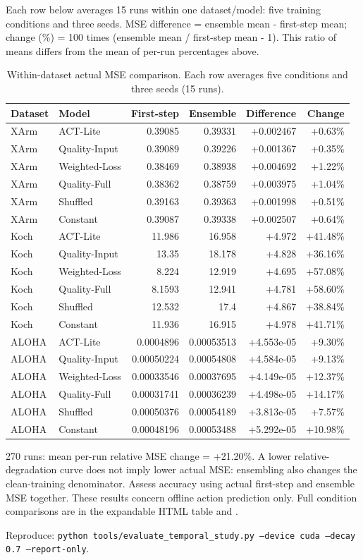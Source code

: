 \documentclass[11pt,a4paper]{article}
\newcommand{\code}[1]{\texttt{\small #1}}
\begin{document}
Each row below averages 15 runs within one dataset/model: five training conditions and three seeds. MSE difference = ensemble mean - first-step mean; change (\%) = 100 times (ensemble mean / first-step mean - 1). This ratio of means differs from the mean of per-run percentages above.
\begin{table}[H]\centering\small\begin{tabularx}{\linewidth}{lYrrrr}\toprule
Dataset & Model & First-step & Ensemble & Difference & Change\\\midrule
XArm & ACT-Lite & 0.39085 & 0.39331 & +0.002467 & +0.63\%\\
XArm & Quality-Input & 0.39089 & 0.39226 & +0.001367 & +0.35\%\\
XArm & Weighted-Loss & 0.38469 & 0.38938 & +0.004692 & +1.22\%\\
XArm & Quality-Full & 0.38362 & 0.38759 & +0.003975 & +1.04\%\\
XArm & Shuffled & 0.39163 & 0.39363 & +0.001998 & +0.51\%\\
XArm & Constant & 0.39087 & 0.39338 & +0.002507 & +0.64\%\\
Koch & ACT-Lite & 11.986 & 16.958 & +4.972 & +41.48\%\\
Koch & Quality-Input & 13.35 & 18.178 & +4.828 & +36.16\%\\
Koch & Weighted-Loss & 8.224 & 12.919 & +4.695 & +57.08\%\\
Koch & Quality-Full & 8.1593 & 12.941 & +4.781 & +58.60\%\\
Koch & Shuffled & 12.532 & 17.4 & +4.867 & +38.84\%\\
Koch & Constant & 11.936 & 16.915 & +4.978 & +41.71\%\\
ALOHA & ACT-Lite & 0.0004896 & 0.00053513 & +4.553e-05 & +9.30\%\\
ALOHA & Quality-Input & 0.00050224 & 0.00054808 & +4.584e-05 & +9.13\%\\
ALOHA & Weighted-Loss & 0.00033546 & 0.00037695 & +4.149e-05 & +12.37\%\\
ALOHA & Quality-Full & 0.00031741 & 0.00036239 & +4.498e-05 & +14.17\%\\
ALOHA & Shuffled & 0.00050376 & 0.00054189 & +3.813e-05 & +7.57\%\\
ALOHA & Constant & 0.00048196 & 0.00053488 & +5.292e-05 & +10.98\%\\
\bottomrule\end{tabularx}\caption{Within-dataset actual MSE comparison. Each row averages five conditions and three seeds (15 runs).}\end{table}
270 runs: mean per-run relative MSE change = +21.20\%. A lower relative-degradation curve does not imply lower actual MSE: ensembling also changes the clean-training denominator. Assess accuracy using actual first-step and ensemble MSE together. These results concern offline action prediction only.
\noindent Full condition comparisons are in the expandable HTML table and .
\par\noindent Reproduce: \code{python tools/evaluate\_temporal\_study.py --device cuda --decay 0.7 --report-only}.
\par\endgroup
\clearpage
\end{document}
